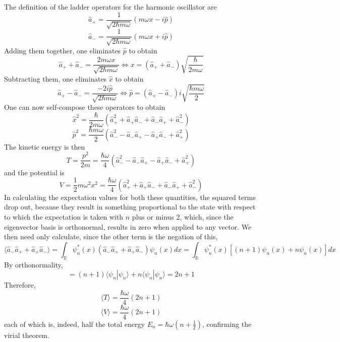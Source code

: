 \documentclass{article}
\begin{document}
\section{}
The definition of the ladder operators for the harmonic oscillator are
\[
  \hat{a}_{+}=\frac{1}{\sqrt{2\hbar m\omega}}\left( m\omega x-i\hat{p} \right)
\]
\[
  \hat{a}_{-}=\frac{1}{\sqrt{2\hbar m\omega}}\left( m\omega x+i\hat{p} \right)
\]
Adding them together, one eliminates $\hat{p}$ to obtain
\[
  \hat{a}_{+}+\hat{a}_{-}=\frac{2m\omega x}{\sqrt{2\hbar m\omega}}
  \Leftrightarrow x=(\hat{a}_{+}+\hat{a}_{-})\sqrt{\frac{\hbar}{2m\omega}}
\]
Subtracting them, one eliminates $\hat{x}$ to obtain
\[
  \hat{a}_{+}-\hat{a}_{-}=\frac{-2i\hat{p}}{\sqrt{2\hbar m\omega}}
  \Leftrightarrow \hat{p}=(\hat{a}_{+}-\hat{a}_{-})i\sqrt{\frac{\hbar m\omega}{2}}
\]
One can now self-compose these operators to obtain
\[
  \hat{x}^{2}=\frac{\hbar}{2m\omega}(\hat{a}_{+}^{2}+\hat{a}_{+}\hat{a}_{-}+\hat{a}_{-}\hat{a}_{+}+\hat{a}_{-}^{2})
\]
\[
  \hat{p}^{2}=\frac{\hbar m\omega}{2}(\hat{a}_{-}^{2}-\hat{a}_{-}\hat{a}_{+}-\hat{a}_{+}\hat{a}_{-}+\hat{a}_{+}^{2})
\]
The kinetic energy is then
\[
 {T}=\frac{p^{2}}{2m}=\frac{\hbar\omega}{4}(\hat{a}_{-}^{2}-\hat{a}_{-}\hat{a}_{+}-\hat{a}_{+}\hat{a}_{-}+\hat{a}_{+}^{2})
\]
and the potential is
\[V=\frac{1}{2}m\omega^{2}x^{2}=\frac{\hbar\omega}{4}(\hat{a}_{+}^{2}+\hat{a}_{+}\hat{a}_{-}+\hat{a}_{-}\hat{a}_{+}+\hat{a}_{-}^{2})\]
In calculating the expectation values for both these quantities, the squared terms drop out, because they result in something proportional to the state with respect to which the expectation is taken with $n$ plus or minus 2, which, since the eigenvector basis is orthonormal, results in zero when applied to any vector.
We then need only calculate, since the other term is the negation of this,
\[
  \langle \hat{a}_{-}\hat{a}_{+}+\hat{a}_{+}\hat{a}_{-}\rangle
  =\int_{\mathbb{R}}\psi_{n}^{*}(x)(\hat{a}_{-}\hat{a}_{+}+\hat{a}_{+}\hat{a}_{-})\psi_{n}(x)dx
  =\int_{\mathbb{R}}\psi_{n}^{*}(x)[(n+1)\psi_{n}(x)+n\psi_{n}(x)]dx
\]
By orthonormality,
\[
  =(n+1)\langle \psi_{n}|\psi_{n} \rangle+n\langle \psi_{n}|\psi_{n} \rangle=2n+1
\]
Therefore,
\[\langle T \rangle=\frac{\hbar\omega}{4}(2n+1)\]
\[\langle V \rangle=\frac{\hbar\omega}{4}(2n+1)\]
each of which is, indeed, half the total energy $E_{n}=\hbar\omega(n+\frac{1}{2})$, confirming the virial theorem.
\end{document}
